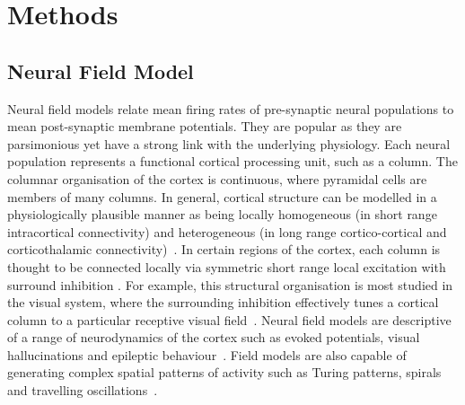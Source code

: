 \documentclass[10pt]{article}
\begin{document}
\section*{Methods}

\subsection{Neural Field Model}\label{NeuralModelSection} 
Neural field models relate mean firing rates of pre-synaptic neural populations to mean post-synaptic membrane potentials. They are popular as they are parsimonious yet have a strong link with the underlying physiology. Each neural population represents a functional cortical processing unit, such as a column. The columnar organisation of the cortex is continuous, where pyramidal cells are members of many columns. In general, cortical structure can be modelled in a physiologically plausible manner as being locally homogeneous (in short range intracortical connectivity) and heterogeneous (in long range cortico-cortical and corticothalamic connectivity)~\cite{Jirsa2009,Qubbaj2007}. In certain regions of the cortex, each column is thought to be connected locally via symmetric short range local excitation with surround inhibition \cite{Braitenberg1998}. For example, this structural organisation is most studied in the visual system, where the surrounding inhibition effectively tunes a cortical column to a particular receptive visual field~\cite{Sullivan2006}. Neural field models are descriptive of a range of neurodynamics of the cortex such as evoked potentials, visual hallucinations and epileptic behaviour~\cite{David2003,Bressloff2001,Breakspear2006}. Field models are also capable of generating complex spatial patterns of activity such as Turing patterns, spirals and travelling oscillations~\cite{Amari1977,Coombes2005,Coombes2007}.
\end{document}
